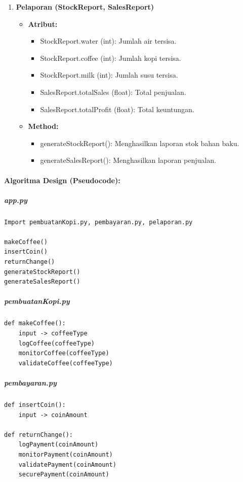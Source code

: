 \documentclass[12pt]{article}
\begin{document}
\begin{enumerate}
    \item \textbf{Pelaporan (StockReport, SalesReport)}
    \begin{itemize}
        \item \textbf{Atribut:}
        \begin{itemize}
            \item StockReport.water (int): Jumlah air tersisa.
            \item StockReport.coffee (int): Jumlah kopi tersisa.
            \item StockReport.milk (int): Jumlah susu tersisa.
            \item SalesReport.totalSales (float): Total penjualan.
            \item SalesReport.totalProfit (float): Total keuntungan.
        \end{itemize}
        \item \textbf{Method:}
        \begin{itemize}
            \item generateStockReport(): Menghasilkan laporan stok bahan baku.
            \item generateSalesReport(): Menghasilkan laporan penjualan.
        \end{itemize}
    \end{itemize}
\end{enumerate}

\paragraph{Algoritma Design (Pseudocode):}

\subparagraph{app.py}
\begin{verbatim}
Import pembuatanKopi.py, pembayaran.py, pelaporan.py

makeCoffee()
insertCoin()
returnChange()
generateStockReport()
generateSalesReport()
\end{verbatim}

\subparagraph{pembuatanKopi.py}
\begin{verbatim}
def makeCoffee():
    input -> coffeeType
    logCoffee(coffeeType)
    monitorCoffee(coffeeType)
    validateCoffee(coffeeType)
\end{verbatim}

\subparagraph{pembayaran.py}
\begin{verbatim}
def insertCoin():
    input -> coinAmount

def returnChange():
    logPayment(coinAmount)
    monitorPayment(coinAmount)
    validatePayment(coinAmount)
    securePayment(coinAmount)
\end{verbatim}
\end{document}
